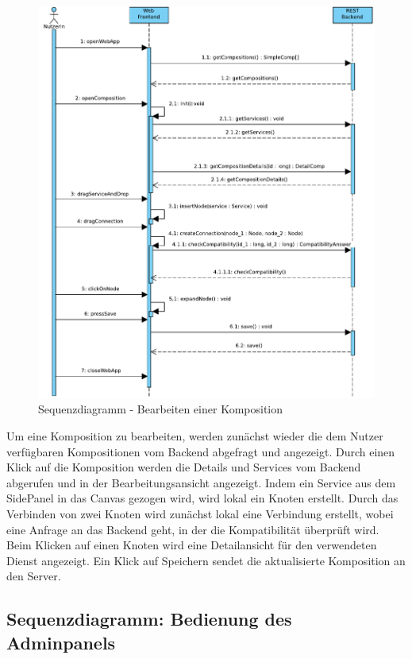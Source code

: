 \begin{figure}[!h]
	\centering
	\includegraphics[width=.5\textwidth]{img/Diagramme/Sequenz/Frontend_editComp}			
	\caption{Sequenzdiagramm - Bearbeiten einer Komposition}
	\label{fig:sequenz-editComp}
\end{figure}
\noindent
Um eine Komposition zu bearbeiten, werden zunächst wieder die dem Nutzer verfügbaren Kompositionen vom Backend abgefragt und angezeigt. Durch einen Klick auf die Komposition werden die Details und Services vom Backend abgerufen und in der Bearbeitungsansicht angezeigt. Indem ein Service aus dem SidePanel in das Canvas gezogen wird, wird lokal ein Knoten erstellt. Durch das Verbinden von zwei Knoten wird zunächst lokal eine Verbindung erstellt, wobei eine Anfrage an das Backend geht, in der die Kompatibilität überprüft wird. Beim Klicken auf einen Knoten wird eine Detailansicht für den verwendeten Dienst angezeigt. Ein Klick auf Speichern sendet die aktualisierte Komposition an den Server.

\newpage
\subsection*{Sequenzdiagramm: Bedienung des Adminpanels}

